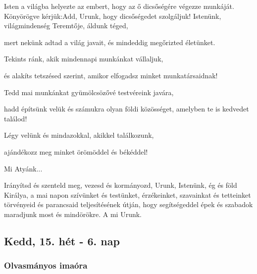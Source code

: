 \documentclass[twoside]{article}
\begin{document}




\begin{preces}{Isten a világba helyezte az embert, hogy az ő dicsőségére végezze munkáját. Könyörögve kérjük:}{Add, Urunk, hogy dicsőségedet szolgáljuk!}
  Istenünk, világmindenség Teremtője, áldunk téged,

  \reddash mert nekünk adtad a világ javait, és mindeddig megőrizted életünket.

  Tekints ránk, akik mindennapi munkánkat vállaljuk,

  \reddash és alakíts tetszésed szerint, amikor elfogadsz minket munkatársaidnak!

  Tedd mai munkánkat gyümölcsözővé testvéreink javára,

  \reddash hadd építsünk velük és számukra olyan földi közösséget, amelyben te is kedvedet találod!

  Légy velünk és mindazokkal, akikkel találkozunk,

  \reddash ajándékozz meg minket örömöddel és békéddel!
\end{preces}
Mi Atyánk...

Irányítsd és szenteld meg, vezesd és kormányozd, Urunk, Istenünk, ég és föld Királya, a mai napon szívünket és testünket, érzékeinket, szavainkat és tetteinket törvényeid és parancsaid teljesítésének útján, hogy segítségeddel épek és szabadok maradjunk most és mindörökre. A mi Urunk.


\subsection*{Kedd, 15. hét - 6. nap}


\subsubsection*{Olvasmányos imaóra}

\end{document}
